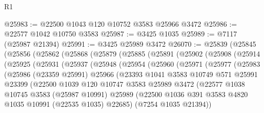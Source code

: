 \begin{lexlean}{R1}
\begin{coremodule}
@25983 := @22500 @1043 @120 @10752 @3583 @25966 @3472
@25986 := @22577 @1042 @10750 @3583
@25987 := @3425 @1035
@25989 := @7117 (@25987 @21394)
@25991 := @3425 @25989 @3472
@26070 := @25839
    (@25845
      (@25856
        (@25862
          (@25868
            (@25879
              (@25885
                (@25891
                  (@25902
                    (@25908
                      (@25914
                        (@25925
                          (@25931
                            (@25937
                              (@25948
                                (@25954
                                  (@25960
                                    (@25971
                                      (@25977
                                        (@25983
                                          (@25986
                                            (@23359 @25991)
                                            @25966
                                            (@23393
                                              @1041
                                              @3583
                                              @10749
                                              @571
                                              @25991
                                              @23399
                                              (@22500
                                                @1039
                                                @120
                                                @10747
                                                @3583
                                                @25989
                                                @3472
                                                (@22577
                                                  @1038
                                                  @10745
                                                  @3583
                                                  (@25987 @10991)
                                                  @25989
                                                  (@22500
                                                    @1036
                                                    @391
                                                    @3583
                                                    @4820
                                                    @1035
                                                    @10991
                                                    (@22535 @1035)
                                                    @22685)
                                                  (@7254 @1035 @21394))

\end{coremodule}
\end{lexlean}
